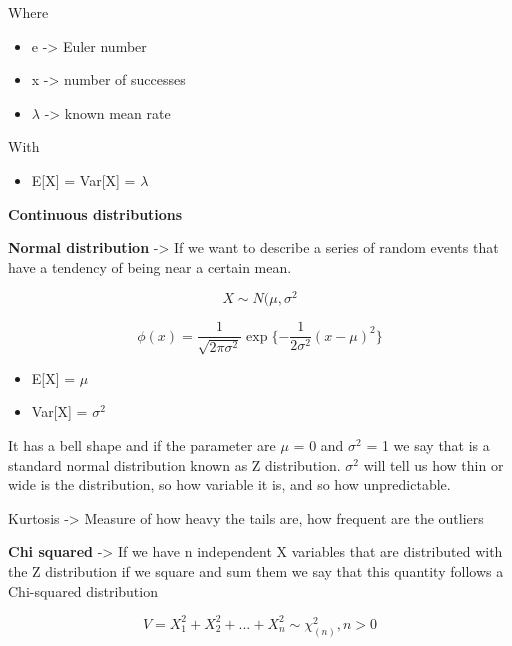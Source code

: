 Where

\begin{itemize}
    \item e -> Euler number
    \item x -> number of successes
    \item $\lambda $ -> known mean rate
\end{itemize}

With
\begin{itemize}
    \item E[X] = Var[X] = $\lambda$
\end{itemize}


\textbf{Continuous distributions}

\vspace{10pt}


\textbf{Normal distribution} -> If we want to describe a series of random events that have a tendency of being near a certain mean.

\begin{equation}
    X \sim N(\mu, \sigma^2
\end{equation}

\begin{equation}
    \phi (x) = \frac{1}{\sqrt{2\pi\sigma^2}} \exp{\{-\frac{1}{2\sigma^2} (x-\mu)^2\}}
\end{equation}

\begin{itemize}
    \item E[X] = $\mu$
    \item Var[X] = $\sigma^2$
\end{itemize}

It has a bell shape and if the parameter are $\mu$ = 0 and $\sigma^2$ = 1 we say that is a standard normal distribution known as Z distribution. $\sigma^2$ will tell us how thin or wide is the distribution, so how variable it is, and so how unpredictable. 

Kurtosis -> Measure of how heavy the tails are, how frequent are the outliers

\vspace{10pt}

\vspace{10pt}

\textbf{Chi squared} -> If we have n independent X variables that are distributed with the Z distribution if we square and sum them we say that this quantity follows a Chi-squared distribution

\begin{equation}
    V=X_1^2+X_2^2+...+X_n^2 \sim\chi_{(n)}^2, n>0
\end{equation}

